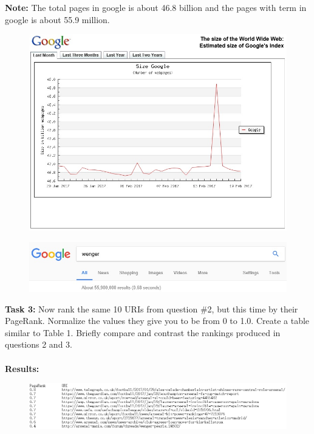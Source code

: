 \documentclass{article}
\begin{document}
		\noindent\textbf{Note: }The total pages in google is about 46.8 billion and the pages with term in google is about 55.9 million.
		\begin{figure}[h]
			\centering
			\begin{minipage}{.5\textwidth}
				\centering
				\includegraphics[width=1\linewidth]{googleSize.jpg}
				\label{fig:google size}
			\end{minipage}%
			\begin{minipage}{.5\textwidth}
				\centering 
				\includegraphics[width=1\linewidth]{wengerGoogle.jpg}
				\label{fig:wenger google}
			\end{minipage}
		\end{figure}

		\noindent
		\textbf{Task 3: }Now rank the same 10 URIs from question \#2, but this time by their PageRank. Normalize the
values they give you to be from 0 to 1.0. Create a table similar to Table 1. Briefly compare and contrast the rankings produced in questions 2 and 3.\\\\
		\noindent
		\textbf{Results:}
		\begin{figure}[h]
			\centering 
			\includegraphics[width=1\textwidth]{PageRank.png}
			\label{fig:PageRank} 
		\end{figure}
\end{document}
